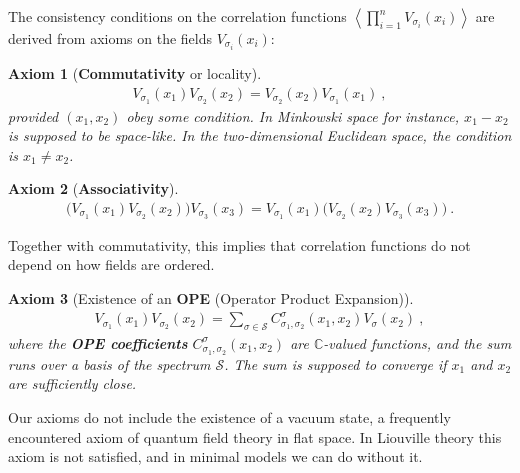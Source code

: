 \documentclass[12pt, a4paper, notitlepage, twoside]{report}
\numberwithin{equation}{section}
\theoremstyle{break}
\newtheorem{hyp}{Axiom}[chapter]
\begin{document}
The consistency conditions on the correlation functions $\left\langle\prod_{i=1}^n V_{\sigma_i}(x_i)\right\rangle$ are derived from axioms on the fields $V_{\sigma_i}(x_i)$:

\begin{hyp}[\textbf{Commutativity} or locality]
\label{ax:col}
\begin{align}
 \boxed{V_{\sigma_1}(x_1)V_{\sigma_2}(x_2) = V_{\sigma_2}(x_2) V_{\sigma_1}(x_1)}\ ,
\label{comm}
\end{align}
provided $(x_1,x_2)$ obey some condition.
In Minkowski space for instance, $x_1-x_2$ is supposed to be space-like.
In the two-dimensional Euclidean space, the condition is $x_1\neq x_2$.
\end{hyp}
\begin{hyp}[\textbf{Associativity}]
\label{ax:ass}
\begin{align}
 \boxed{\Big(V_{\sigma_1}(x_1)V_{\sigma_2}(x_2)\Big) V_{\sigma_3}(x_3) = V_{\sigma_1}(x_1)  \Big(V_{\sigma_2}(x_2) V_{\sigma_3}(x_3)\Big)}\ .
\label{asso}
\end{align}
\end{hyp} 
\noindent
Together with commutativity, this implies that correlation functions do not depend on how fields are ordered.
\begin{hyp}[Existence of an \textbf{\boldmath OPE} (Operator Product Expansion)]
 \label{ax:ope}
 \begin{align}
 \boxed{V_{\sigma_1}(x_1)V_{\sigma_2}(x_2) = \sum_{\sigma\in \mathcal{S}} C_{\sigma_1,\sigma_2}^{\sigma}(x_1,x_2) V_{\sigma}(x_2)}\ ,
\label{ope}
\end{align}
where the \textbf{\boldmath OPE coefficients} $C_{\sigma_1,\sigma_2}^{\sigma}(x_1,x_2)$ are $\mathbb{C}$-valued functions, and the sum runs over a basis of the spectrum $\mathcal{S}$. 
The sum is supposed to converge if $x_1$ and $x_2$ are sufficiently close. 
\end{hyp} 
\noindent
Our axioms do not include the existence of a vacuum state, a frequently encountered axiom of quantum field theory in flat space.
In Liouville theory this axiom is not satisfied, and in minimal models we can do without it. 
\end{document}
